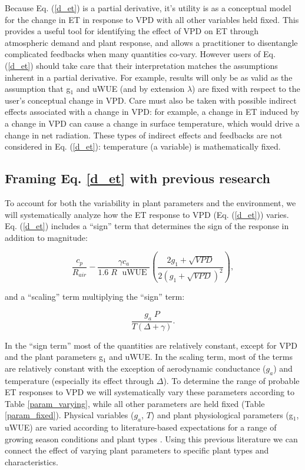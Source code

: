   Because Eq. (\ref{d_et}) is a partial derivative, it's utility is as
  a conceptual model for the change in ET in response to VPD with all
  other variables held fixed. This provides a useful tool for
  identifying the effect of VPD on ET through atmospheric demand and
  plant response, and allows a practitioner to disentangle complicated
  feedbacks when many quantities co-vary. However users of
  Eq. (\ref{d_et}) should take care that their interpretation matches
  the assumptions inherent in a partial derivative. For example,
  results will only be as valid as the assumption that g$_1$ and uWUE
  (and by extension $\lambda$) are fixed with respect to the user's
  conceptual change in VPD. Care must also be taken with possible
  indirect effects associated with a change in VPD: for example, a
  change in ET induced by a change in VPD can cause a change in
  surface temperature, which would drive a change in net
  radiation. These types of indirect effects and feedbacks are not
  considered in Eq. (\ref{d_et}): temperature (a variable) is
  mathematically fixed.

\subsection{Framing Eq. \ref{d_et} with previous research }


  To account for both the variability in plant parameters and the
  environment, we will systematically analyze how the ET response to
  VPD (Eq. (\ref{d_et})) varies. Eq. (\ref{d_et}) includes a
  ``sign'' term that determines the sign of the response in addition
  to magnitude:

\begin{equation}
  \label{sign}
  \frac{c_p}{R_{air}} - \frac{\gamma c_a }{1.6 \; R\; \text{ uWUE }} \left( \frac{2 g_1 + \sqrt{VPD}}{2 (g_1 + \sqrt{VPD})^2}\right),
\end{equation}

and a ``scaling'' term multiplying the ``sign'' term:

\begin{equation}
  \frac{g_a \; P}{T(\Delta + \gamma)}.
\end{equation}

In the ``sign term'' most of the quantities are relatively constant,
except for VPD and the plant parameters g$_1$ and uWUE. In the scaling
term, most of the terms are relatively constant with the exception of
aerodynamic conductance ($g_a$) and temperature (especially its effect
through $\Delta$). To determine the range of probable ET responses to
VPD we will systematically vary these parameters according to Table
\ref{param_varying}, while all other parameters are held fixed (Table
\ref{param_fixed}). Physical variables ($g_a$, $T$) and plant
physiological parameters (g$_1$, uWUE) are varied according to
literature-based expectations for a range of growing season conditions
and plant types \cite{Zhou_2015, Medlyn_2017}. Using this previous
literature we can connect the effect of varying plant parameters to
specific plant types and characteristics.

